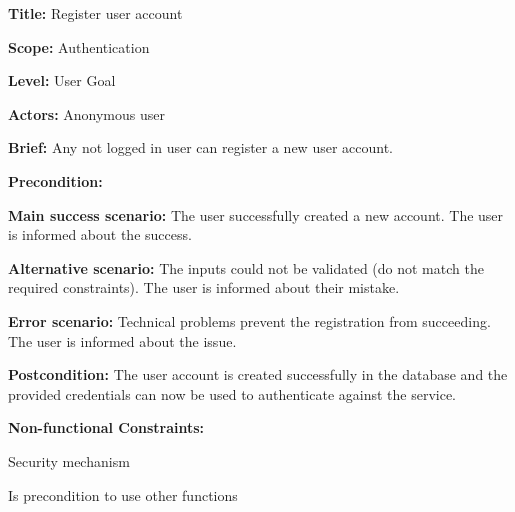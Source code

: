 
\begin{DoxyItemize}
\item {\bfseries{Title\+:}} Register user account
\item {\bfseries{Scope\+:}} Authentication
\item {\bfseries{Level\+:}} User Goal
\item {\bfseries{Actors\+:}} Anonymous user
\item {\bfseries{Brief\+:}} Any not logged in user can register a new user account.
\end{DoxyItemize}


\begin{DoxyItemize}
\item {\bfseries{Precondition\+:}}
\item {\bfseries{Main success scenario\+:}} The user successfully created a new account. The user is informed about the success.
\item {\bfseries{Alternative scenario\+:}} The inputs could not be validated (do not match the required constraints). The user is informed about their mistake.
\item {\bfseries{Error scenario\+:}} Technical problems prevent the registration from succeeding. The user is informed about the issue.
\item {\bfseries{Postcondition\+:}} The user account is created successfully in the database and the provided credentials can now be used to authenticate against the service.
\item {\bfseries{Non-\/functional Constraints\+:}}
\begin{DoxyItemize}
\item Security mechanism
\item Is precondition to use other functions 
\end{DoxyItemize}
\end{DoxyItemize}
